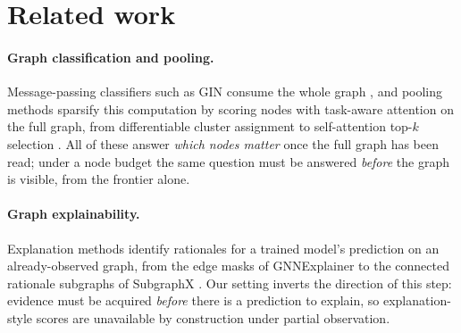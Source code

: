 %

\section{Related work}
\label{sec:related}

\paragraph{Graph classification and pooling.}
Message-passing classifiers such as GIN consume the whole graph , and pooling methods sparsify this computation by scoring nodes with task-aware attention on the full graph, from differentiable cluster assignment to self-attention top-$k$ selection . All of these answer \emph{which nodes matter} once the full graph has been read; under a node budget the same question must be answered \emph{before} the graph is visible, from the frontier alone.

\paragraph{Graph explainability.}
Explanation methods identify rationales for a trained model's prediction on an already-observed graph, from the edge masks of GNNExplainer to the connected rationale subgraphs of SubgraphX . Our setting inverts the direction of this step: evidence must be acquired \emph{before} there is a prediction to explain, so explanation-style scores are unavailable by construction under partial observation.

